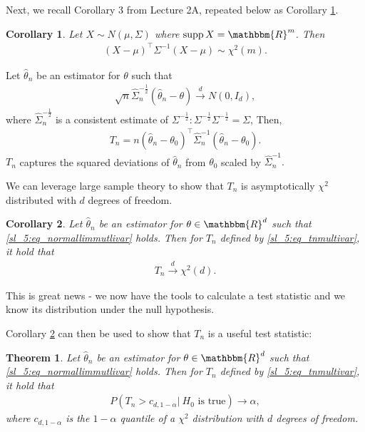 \documentclass{article}
\newtheorem{theorem}{Theorem}
\DeclareMathOperator\supp{supp}
\newtheorem{corollary}{Corollary}[theorem]
\begin{document}
    Next, we recall Corollary 3 from Lecture 2A, repeated below as Corollary \ref{chisq}. 
    \begin{corollary}\label{chisq}
    Let $X \sim N(\mu, \Sigma)$ where $\supp X = \mathbbm{R}^m$. Then \begin{align}
        (X - \mu)^\top \Sigma^{-1}(X - \mu) \sim \chi^2(m).
    \end{align}  
    \end{corollary}
    Let $\hat{\theta}_n$ be an estimator for $\theta$ such that \begin{align}\label{sl_5:eq_normallimmutlivar}
        \sqrt{n}\hat{\Sigma}_n^{-\frac{1}{2}}\left(\hat{\theta}_n - \theta\right) \overset{d}{\to} N(0, I_d),
    \end{align}
    where $\hat{\Sigma}_n^{-\frac{1}{2}}$ is a consistent estimate of $\Sigma^{-\frac{1}{2}}: \Sigma^{-\frac{1}{2}} \Sigma^{-\frac{1}{2}} = \Sigma$, Then,
    \begin{align}\label{sl_5:eq_tnmultivar}
        T_n = n\left(\hat{\theta}_n - \theta_0\right)^\top\hat{\Sigma}_n^{-1}\left(\hat{\theta}_n - \theta_0\right).
    \end{align}
    $T_n$ captures the squared deviations of $\hat{\theta}_n$ from $\theta_0$ scaled by $\hat{\Sigma}_n^{-1}.$\vfill

    We can leverage large sample theory to show that $T_n$ is asymptotically $\chi^2$ distributed with $d$ degrees of freedom.
    
    \begin{corollary}\label{sl_5:cor_chi2}
     Let  $\hat{\theta}_n$ be an estimator for $\theta \in \mathbbm{R}^d$ such that \eqref{sl_5:eq_normallimmutlivar} holds. Then for $T_n$ defined by  \eqref{sl_5:eq_tnmultivar}, it hold that \begin{align}
            T_n \overset{d}{\to} \chi^2(d).
        \end{align}
    \end{corollary}


    This is great news - we now have the tools to calculate a test statistic and 
    we know its distribution under the null hypothesis.

    

    Corollary \ref{sl_5:cor_chi2} can then be used to show that $T_n$ is a useful test statistic:
    
    \begin{theorem}
     Let  $\hat{\theta}_n$ be an estimator for $\theta \in \mathbbm{R}^d$ such that \eqref{sl_5:eq_normallimmutlivar} holds. Then for $T_n$ defined by  \eqref{sl_5:eq_tnmultivar}, it hold that \begin{align}
            P(T_n > c_{d, 1-\alpha}\vert \: H_0 \text{ is true}) \to \alpha,
        \end{align}
        where $c_{d, 1-\alpha}$ is the $1-\alpha$ quantile of a $\chi^2$ distribution with $d$ degrees of freedom.
    \end{theorem}
\end{document}
